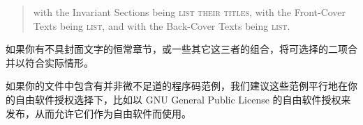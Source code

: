 \bigskip
\begin{quote}
    with the Invariant Sections being \textsc{list their titles}, with the Front-Cover Texts being \textsc{list}, and with the Back-Cover Texts being \textsc{list}.
\end{quote}
\bigskip


如果你有不具封面文字的恒常章节，或一些其它这三者的组合，将可选择的二项合并以符合实际情形。


如果你的文件中包含有并非微不足道的程序码范例，我们建议这些范例平行地在你的自由软件授权选择下，比如以 GNU General Public License 的自由软件授权来发布，从而允许它们作为自由软件而使用。




